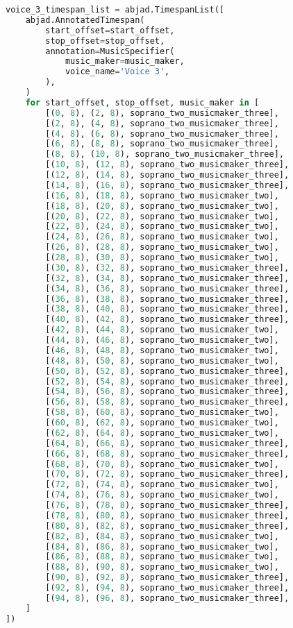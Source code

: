 \begin{lstlisting}[language=Python, caption=Invocation Source Code]
voice_3_timespan_list = abjad.TimespanList([
    abjad.AnnotatedTimespan(
        start_offset=start_offset,
        stop_offset=stop_offset,
        annotation=MusicSpecifier(
            music_maker=music_maker,
            voice_name='Voice 3',
        ),
    )
    for start_offset, stop_offset, music_maker in [
        [(0, 8), (2, 8), soprano_two_musicmaker_three],
        [(2, 8), (4, 8), soprano_two_musicmaker_three],
        [(4, 8), (6, 8), soprano_two_musicmaker_three],
        [(6, 8), (8, 8), soprano_two_musicmaker_three],
        [(8, 8), (10, 8), soprano_two_musicmaker_three],
        [(10, 8), (12, 8), soprano_two_musicmaker_three],
        [(12, 8), (14, 8), soprano_two_musicmaker_three],
        [(14, 8), (16, 8), soprano_two_musicmaker_three],
        [(16, 8), (18, 8), soprano_two_musicmaker_two],
        [(18, 8), (20, 8), soprano_two_musicmaker_two],
        [(20, 8), (22, 8), soprano_two_musicmaker_two],
        [(22, 8), (24, 8), soprano_two_musicmaker_two],
        [(24, 8), (26, 8), soprano_two_musicmaker_two],
        [(26, 8), (28, 8), soprano_two_musicmaker_two],
        [(28, 8), (30, 8), soprano_two_musicmaker_two],
        [(30, 8), (32, 8), soprano_two_musicmaker_three],
        [(32, 8), (34, 8), soprano_two_musicmaker_three],
        [(34, 8), (36, 8), soprano_two_musicmaker_three],
        [(36, 8), (38, 8), soprano_two_musicmaker_three],
        [(38, 8), (40, 8), soprano_two_musicmaker_three],
        [(40, 8), (42, 8), soprano_two_musicmaker_three],
        [(42, 8), (44, 8), soprano_two_musicmaker_two],
        [(44, 8), (46, 8), soprano_two_musicmaker_two],
        [(46, 8), (48, 8), soprano_two_musicmaker_two],
        [(48, 8), (50, 8), soprano_two_musicmaker_two],
        [(50, 8), (52, 8), soprano_two_musicmaker_three],
        [(52, 8), (54, 8), soprano_two_musicmaker_three],
        [(54, 8), (56, 8), soprano_two_musicmaker_three],
        [(56, 8), (58, 8), soprano_two_musicmaker_three],
        [(58, 8), (60, 8), soprano_two_musicmaker_two],
        [(60, 8), (62, 8), soprano_two_musicmaker_two],
        [(62, 8), (64, 8), soprano_two_musicmaker_two],
        [(64, 8), (66, 8), soprano_two_musicmaker_three],
        [(66, 8), (68, 8), soprano_two_musicmaker_three],
        [(68, 8), (70, 8), soprano_two_musicmaker_two],
        [(70, 8), (72, 8), soprano_two_musicmaker_three],
        [(72, 8), (74, 8), soprano_two_musicmaker_two],
        [(74, 8), (76, 8), soprano_two_musicmaker_two],
        [(76, 8), (78, 8), soprano_two_musicmaker_three],
        [(78, 8), (80, 8), soprano_two_musicmaker_three],
        [(80, 8), (82, 8), soprano_two_musicmaker_three],
        [(82, 8), (84, 8), soprano_two_musicmaker_two],
        [(84, 8), (86, 8), soprano_two_musicmaker_two],
        [(86, 8), (88, 8), soprano_two_musicmaker_two],
        [(88, 8), (90, 8), soprano_two_musicmaker_two],
        [(90, 8), (92, 8), soprano_two_musicmaker_three],
        [(92, 8), (94, 8), soprano_two_musicmaker_three],
        [(94, 8), (96, 8), soprano_two_musicmaker_three],
    ]
])


\end{lstlisting}
